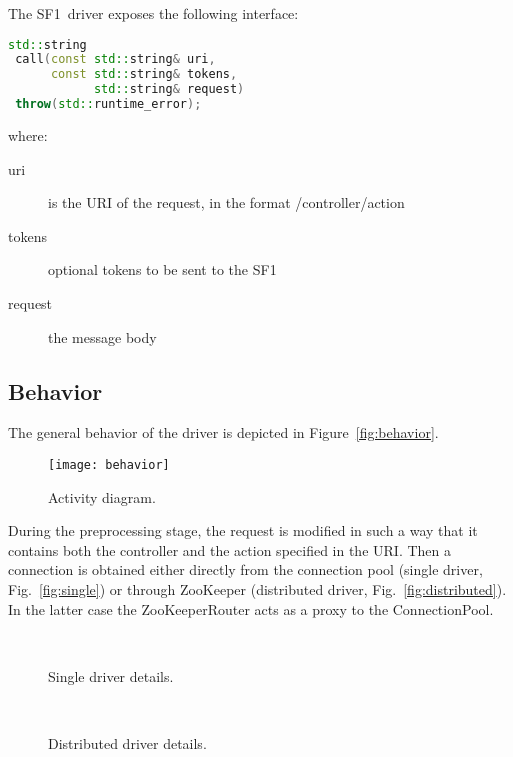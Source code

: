 \documentclass[a4paper,10pt]{article}
\newcommand{\sfr}{\textsf{SF1}}
\newcommand{\code}[1]{\textsf{#1}}
\begin{document}
The \sfr\ driver exposes the following interface:
\begin{lstlisting}[language=C++,frame=single]
 std::string 
 call(const std::string& uri, 
      const std::string& tokens, 
            std::string& request) 
 throw(std::runtime_error); 
\end{lstlisting}
where:
\begin{description}
 \item[\code{uri}] is the URI of the request, in the format \code{/controller/action}
 \item[\code{tokens}] optional tokens to be sent to the \sfr
 \item[\code{request}] the message body
\end{description}

\subsection{Behavior}

The general behavior of the driver is depicted in Figure~\vref{fig:behavior}.
\begin{figure}
 \centering
 \texttt{[image: behavior]}
 \caption{Activity diagram.}
 \label{fig:behavior}
\end{figure}
During the preprocessing stage, the request is modified in such a way that it
contains both the controller and the action specified in the URI.
Then a connection is obtained either directly from the connection pool 
(single driver, Fig.~\vref{fig:single}) or through ZooKeeper 
(distributed driver, Fig.~\vref{fig:distributed}).
In the latter case the \code{ZooKeeperRouter} acts as a proxy to the \code{ConnectionPool}.

\begin{figure}
 \centering
 \\
 \caption{Single driver details.}
 \label{fig:single}
\end{figure}

\begin{figure}
 \centering
 \\
 \caption{Distributed driver details.}
 \label{fig:distributed}
\end{figure}
\end{document}
